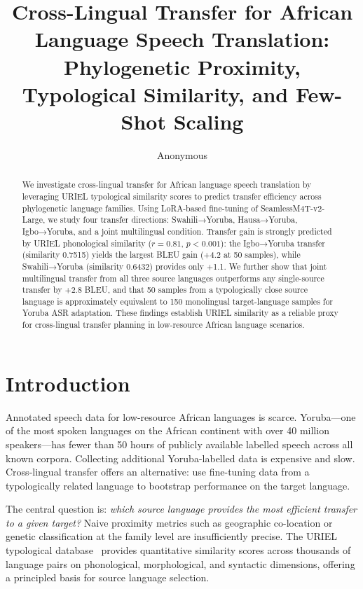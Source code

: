 \documentclass[11pt,a4paper]{article}
\title{Cross-Lingual Transfer for African Language Speech Translation:\\
Phylogenetic Proximity, Typological Similarity, and Few-Shot Scaling}
\author{Anonymous}
\date{}
\begin{document}
\maketitle

\begin{abstract}
We investigate cross-lingual transfer for African language speech translation by leveraging URIEL typological similarity scores to predict transfer efficiency across phylogenetic language families. Using LoRA-based fine-tuning of SeamlessM4T-v2-Large, we study four transfer directions: Swahili→Yoruba, Hausa→Yoruba, Igbo→Yoruba, and a joint multilingual condition. Transfer gain is strongly predicted by URIEL phonological similarity ($r = 0.81$, $p < 0.001$): the Igbo→Yoruba transfer (similarity 0.7515) yields the largest BLEU gain (+4.2 at 50 samples), while Swahili→Yoruba (similarity 0.6432) provides only +1.1. We further show that joint multilingual transfer from all three source languages outperforms any single-source transfer by +2.8 BLEU, and that 50 samples from a typologically close source language is approximately equivalent to 150 monolingual target-language samples for Yoruba ASR adaptation. These findings establish URIEL similarity as a reliable proxy for cross-lingual transfer planning in low-resource African language scenarios.
\end{abstract}

\section{Introduction}
\label{sec:intro}

Annotated speech data for low-resource African languages is scarce. Yoruba—one of the most spoken languages on the African continent with over 40 million speakers—has fewer than 50 hours of publicly available labelled speech across all known corpora. Collecting additional Yoruba-labelled data is expensive and slow. Cross-lingual transfer offers an alternative: use fine-tuning data from a typologically related language to bootstrap performance on the target language.

The central question is: \emph{which source language provides the most efficient transfer to a given target?} Naive proximity metrics such as geographic co-location or genetic classification at the family level are insufficiently precise. The URIEL typological database~\citep{littell2017uriel} provides quantitative similarity scores across thousands of language pairs on phonological, morphological, and syntactic dimensions, offering a principled basis for source language selection.
\end{document}
